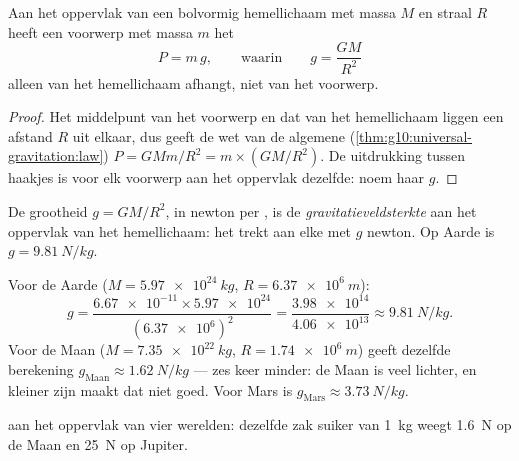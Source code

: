 \begin{proposition}\label{prop:g10:universal-gravitation:surfaceg}
Aan het oppervlak van een bolvormig hemellichaam met massa $M$ en straal
$R$ heeft een voorwerp met massa $m$ het 
\[
P = m\,g,
\qquad\text{waarin}\qquad
g = \frac{G M}{R^2}
\]
alleen van het hemellichaam afhangt, niet van het voorwerp.
\end{proposition}

\begin{proof}
Het middelpunt van het voorwerp en dat van het hemellichaam liggen een
afstand $R$ uit elkaar, dus geeft de wet van de algemene 
(\cref{thm:g10:universal-gravitation:law})
$P = G M m / R^2 = m \times \left(G M / R^2\right)$. De uitdrukking
tussen haakjes is voor elk voorwerp aan het oppervlak dezelfde: noem haar
$g$.
\end{proof}

\begin{definition}[Gravitatieveldsterkte]\label{def:g10:universal-gravitation:fieldstrength}
De grootheid $g = G M / R^2$, in newton per , is de
\emph{gravitatieveldsterkte} aan het
oppervlak van het hemellichaam: het trekt aan elke  met $g$
newton. Op Aarde is $g = \qty{9.81}{N/kg}$.
\end{definition}

\begin{example}[$g$ berekenen]\label{ex:g10:universal-gravitation:gvalues}
Voor de Aarde ($M = \qty{5.97e24}{kg}$, $R = \qty{6.37e6}{m}$):
\[
g = \frac{\num{6.67e-11} \times \num{5.97e24}}{(\num{6.37e6})^2}
= \frac{\num{3.98e14}}{\num{4.06e13}}
\approx \qty{9.81}{N/kg}.
\]
Voor de Maan ($M = \qty{7.35e22}{kg}$, $R = \qty{1.74e6}{m}$) geeft
dezelfde berekening $g_{\text{Maan}} \approx \qty{1.62}{N/kg}$ --- zes
keer minder: de Maan is veel lichter, en kleiner zijn maakt dat niet
goed. Voor Mars is $g_{\text{Mars}} \approx \qty{3.73}{N/kg}$.
\end{example}

\begin{omfigure}

{\small {} aan het oppervlak van vier werelden:
dezelfde zak suiker van \qty{1}{kg} weegt \qty{1.6}{N} op de Maan en
\qty{25}{N} op Jupiter.}
\end{omfigure}

